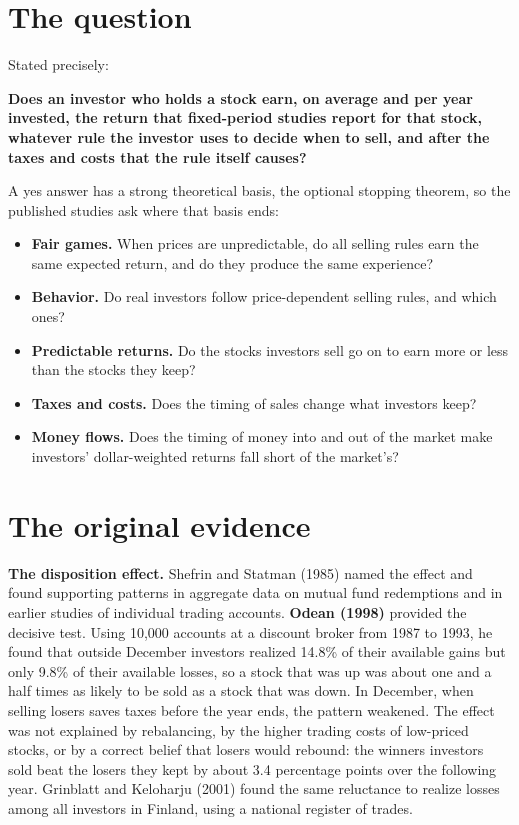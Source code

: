 \section{The question}
\label{sec:hp-claim}

Stated precisely:

\begin{callout}
\textbf{Does an investor who holds a stock earn, on average and per year invested, the return that fixed-period studies report for that stock, whatever rule the investor uses to decide when to sell, and after the taxes and costs that the rule itself causes?}
\end{callout}

A yes answer has a strong theoretical basis, the optional stopping theorem, so the published studies ask where that basis ends:

\begin{itemize}
  \item \textbf{Fair games.} When prices are unpredictable, do all selling rules earn the same expected return, and do they produce the same experience?
  \item \textbf{Behavior.} Do real investors follow price-dependent selling rules, and which ones?
  \item \textbf{Predictable returns.} Do the stocks investors sell go on to earn more or less than the stocks they keep?
  \item \textbf{Taxes and costs.} Does the timing of sales change what investors keep?
  \item \textbf{Money flows.} Does the timing of money into and out of the market make investors' dollar-weighted returns fall short of the market's?
\end{itemize}


\section{The original evidence}
\label{sec:hp-evidence}

\textbf{The disposition effect.} Shefrin and Statman (1985) named the effect and found supporting patterns in aggregate data on mutual fund redemptions and in earlier studies of individual trading accounts. \textbf{Odean (1998)} provided the decisive test. Using 10,000 accounts at a discount broker from 1987 to 1993, he found that outside December investors realized 14.8\% of their available gains but only 9.8\% of their available losses, so a stock that was up was about one and a half times as likely to be sold as a stock that was down. In December, when selling losers saves taxes before the year ends, the pattern weakened. The effect was not explained by rebalancing, by the higher trading costs of low-priced stocks, or by a correct belief that losers would rebound: the winners investors sold beat the losers they kept by about 3.4 percentage points over the following year. Grinblatt and Keloharju (2001) found the same reluctance to realize losses among all investors in Finland, using a national register of trades.

